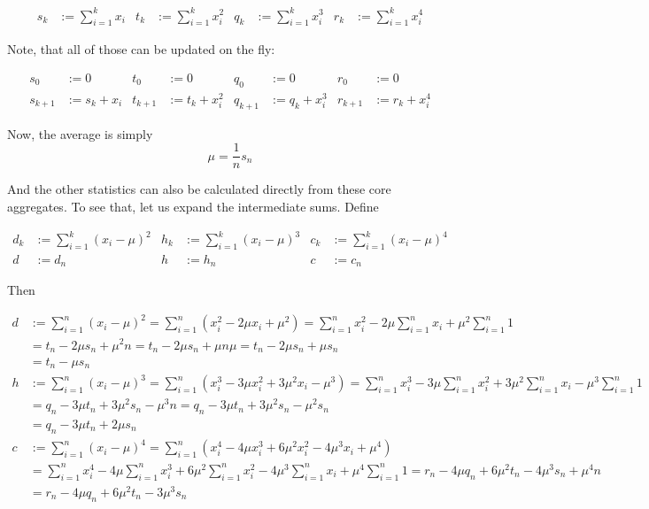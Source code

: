 \documentclass{article}
\begin{document}
\begin{align*}
    s_k &:= \sum_{i=1}^k x_i   &
    t_k &:= \sum_{i=1}^k x_i^2 &
    q_k &:= \sum_{i=1}^k x_i^3 &
    r_k &:= \sum_{i=1}^k x_i^4
\end{align*}

Note, that all of those can be updated on the fly:

\begin{align*}
    s_0 &:= 0 &
    t_0 &:= 0 &
    q_0 &:= 0 &
    r_0 &:= 0 \\
    s_{k+1} &:= s_k + x_i   &
    t_{k+1} &:= t_k + x_i^2 &
    q_{k+1} &:= q_k + x_i^3 &
    r_{k+1} &:= r_k + x_i^4
\end{align*}

Now, the average is simply 
\[\mu = \frac{1}{n}s_n\]

And the other statistics can also be calculated directly from these core aggregates.
To see that, let us expand the intermediate sums. Define

\begin{align*}
    d_k &:= \sum_{i=1}^k(x_i-\mu)^2 &
    h_k &:= \sum_{i=1}^k(x_i-\mu)^3 &
    c_k &:= \sum_{i=1}^k(x_i-\mu)^4 \\
    d &:= d_n &
    h &:= h_n &
    c &:= c_n
\end{align*}

Then

\begin{align*}
    d &:= \sum_{i=1}^n(x_i - \mu)^2
      = \sum_{i=1}^n(x_i^2 - 2\mu x_i + \mu^2)
      = \sum_{i=1}^n x_i^2 -2\mu\sum_{i=1}^n x_i+\mu^2\sum_{i=1}^n 1 \\
      &= t_n -2\mu s_n + \mu^2 n
      = t_n -2\mu s_n + \mu n\mu
      = t_n -2\mu s_n + \mu s_n \\
      &= t_n -\mu s_n \\
    h &:= \sum_{i=1}^n(x_i - \mu)^3
      = \sum_{i=1}^n(x_i^3 - 3\mu x_i^2 + 3\mu^2 x_i - \mu^3)
      = \sum_{i=1}^n x_i^3 - 3\mu\sum_{i=1}^n x_i^2 + 3\mu^2\sum_{i=1}^n x_i - \mu^3\sum_{i=1}^n 1 \\
      &= q_n - 3\mu t_n + 3\mu^2 s_n - \mu^3 n
      = q_n - 3\mu t_n + 3\mu^2 s_n - \mu^2 s_n \\
      &= q_n - 3\mu t_n + 2\mu s_n \\
    c &:= \sum_{i=1}^n(x_i - \mu)^4
      = \sum_{i=1}^n(x_i^4 - 4\mu x_i^3 + 6\mu^2 x_i^2 - 4\mu^3 x_i + \mu^4) \\
      &= \sum_{i=1}^n x_i^4 - 4\mu\sum_{i=1}^n x_i^3
         + 6\mu^2\sum_{i=1}^n x_i^2 - 4\mu^3\sum_{i=1}^n x_i + \mu^4\sum_{i=1}^n 1
      = r_n - 4\mu q_n + 6\mu^2 t_n - 4\mu^3 s_n + \mu^4 n \\
      &= r_n - 4\mu q_n + 6\mu^2 t_n - 3\mu^3 s_n \\
\end{align*}
\end{document}
